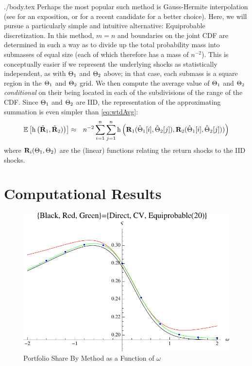 \documentclass{handout}
\begin{document}
\begin{verbatimwrite}{./body.tex}
Perhaps the most popular such method is Gauss-Hermite interpolation
(see \cite{judd:book} for an exposition, or \cite{kopecky2010finite}
for a recent candidate for a better choice).  Here, we will pursue a
particularly simple and intuitive alternative: Equiprobable discretization.  In
this method, $m=n$ and boundaries on the joint CDF are determined in
such a way as to divide up the total probability mass into submasses
of equal size (each of which therefore has a mass of $n^{-2}$).  This
is conceptually easier if we represent the underlying shocks as
statistically independent, as with $\Theta_{1}$ and
$\Theta_{2}$ above; in that case, each submass is a square region
in the $\Theta_{1}$ and $\Theta_{2}$ grid.  We then compute
the average value of $\Theta_{1}$ and $\Theta_{2}$ {\it
  conditional} on their being located in each of the subdivisions of
the range of the CDF.  Since $\Theta_{1}$ and $\Theta_{2}$
are IID, the representation of the approximating summation is even
simpler than \eqref{eq:wtdAvg}:
\begin{equation*}\begin{gathered}\begin{aligned}
  \operatorname{\mathbb{E}}\left[\mathrm{h}\left(\tilde{\mathbf{R}}_{1},\tilde{\mathbf{R}}_{2})\right)\right] & \approx & n^{-2} \sum_{i=1}^{n}\sum_{j=1}^{n} \mathrm{h}\left(\mathbf{R}_{1}(\hat{\Theta}_{1}[i],\hat{\Theta}_{2}[j]),\mathbf{R}_{2}(\hat{\Theta}_{1}[i],\hat{\Theta}_{2}[j]))\right) \label{eq:wtdAvgMod}
\end{aligned}\end{gathered}\end{equation*}
where $\mathbf{R}_{i}(\Theta_{1},\Theta_{2})$ are the (linear) functions relating the return shocks to the IID shocks.


\section{Computational Results}
\begin{figure}
\includegraphics[width=6in]{../Figures/ShareVsCovByMethod}
\caption{Portfolio Share By Method as a Function of $\omega$}\label{fig:ShareVsCovByMethod}
\end{figure}


\end{verbatimwrite}
\end{document}
